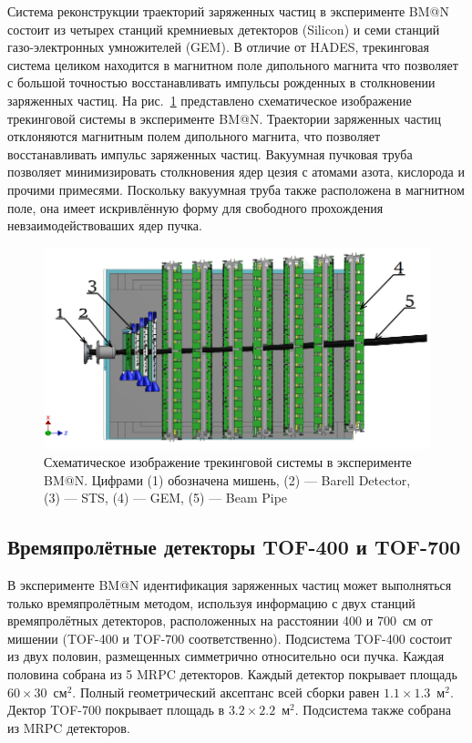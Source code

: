 Система реконструкции траекторий заряженных частиц в эксперименте BM@N состоит из четырех станций кремниевых детекторов (Silicon) и семи станций газо-электронных умножителей (GEM). 
В отличие от HADES, трекинговая система целиком находится в магнитном поле дипольного магнита что позволяет с большой точностью восстанавливать импульсы рожденных в столкновении заряженных частиц.
На рис.~\ref{fig:bmn_tracking} представлено схематическое изображение трекинговой системы в эксперименте BM@N.
Траектории заряженных частиц отклоняются магнитным полем дипольного магнита, что позволяет восстанавливать импульс заряженных частиц.
Вакуумная пучковая труба позволяет минимизировать столкновения ядер цезия с атомами азота, кислорода и прочими примесями.
Поскольку вакуумная труба также расположена в магнитном поле, она имеет искривлённую форму для свободного прохождения невзаимодействоваших ядер пучка.  
%
\begin{figure}[ht]
\begin{center}
    \includegraphics[width=0.75\linewidth]{images/bmn_tracking_system.png}
    \caption{Схематическое изображение трекинговой системы в эксперименте BM@N. Цифрами (1) обозначена мишень,
    (2) --- Barell Detector, (3) --- STS, (4) --- GEM, (5) --- Beam Pipe }
    \label{fig:bmn_tracking}
\end{center}
\end{figure}


\subsection{Времяпролётные детекторы TOF-400 и TOF-700}

В эксперименте BM@N идентификация заряженных частиц может выполняться только времяпролётным методом, используя информацию с двух станций времяпролётных детекторов, расположенных на расстоянии 400 и 700~см от мишении (TOF-400 и TOF-700 соответственно).
Подсистема TOF-400 состоит из двух половин, размещенных симметрично относительно оси пучка.
Каждая половина собрана из 5 MRPC детекторов.
Каждый детектор покрывает площадь $60\times30$~см$^2$.
Полный геометрический аксептанс всей сборки равен $1.1\times1.3$~м$^2$.
Дектор TOF-700 покрывает площадь в $3.2 \times 2.2$~м$^2$.
Подсистема также собрана из MRPC детекторов.

